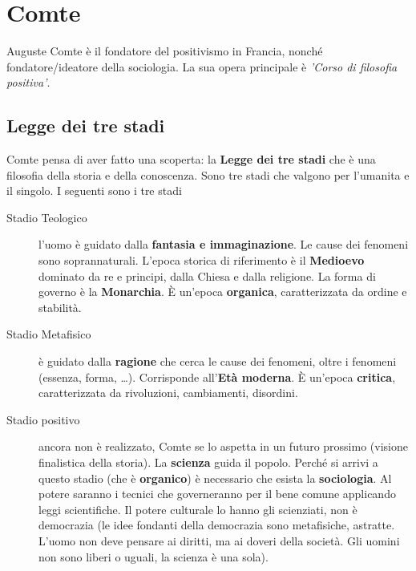 
\section{Comte}
Auguste Comte è il fondatore del positivismo in Francia, nonché fondatore/ideatore della sociologia.
La sua opera principale è \textit{'Corso di filosofia positiva'}. 

\subsection{Legge dei tre stadi}
Comte pensa di aver fatto una scoperta: la \textbf{Legge dei tre stadi} che è una filosofia della
storia e della conoscenza. Sono tre stadi che valgono per l'umanita e il singolo. I seguenti
sono i tre stadi
\begin{description}
  \item[Stadio Teologico] l'uomo è guidato dalla \textbf{fantasia e immaginazione}. Le cause dei
    fenomeni sono soprannaturali. L'epoca storica di riferimento è il \textbf{Medioevo} dominato
    da re e principi, dalla Chiesa e dalla religione. La forma di governo è la \textbf{Monarchia}.
    È un'epoca \textbf{organica}, caratterizzata da ordine e stabilità.
  \item[Stadio Metafisico] è guidato dalla \textbf{ragione} che cerca le cause dei fenomeni, oltre
    i fenomeni (essenza, forma, \ldots). Corrisponde all'\textbf{Età moderna}. È un'epoca 
    \textbf{critica}, caratterizzata da rivoluzioni, cambiamenti, disordini.
  \item[Stadio positivo] ancora non è realizzato, Comte se lo aspetta in un futuro prossimo (visione
    finalistica della storia). La \textbf{scienza} guida il popolo. Perché si arrivi a questo stadio
    (che è \textbf{organico}) è necessario che esista la \textbf{sociologia}. Al potere saranno
    i tecnici che governeranno per il bene comune applicando leggi scientifiche. Il potere
    culturale lo hanno gli scienziati, non è democrazia (le idee fondanti della democrazia sono
    metafisiche, astratte. L'uomo non deve pensare ai diritti, ma ai doveri della società. Gli uomini
    non sono liberi o uguali, la scienza è una sola).
\end{description}

